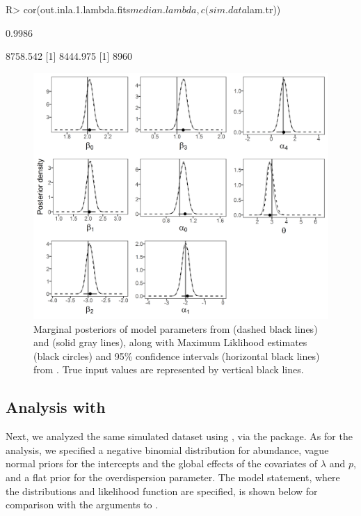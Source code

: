 \documentclass[codesnippet]{jss}
\begin{document}
\begin{CodeInput}
R> cor(out.inla.1.lambda.fits$median.lambda, c(sim.data$lam.tr))
\end{CodeInput}
\begin{CodeOutput}
[1] 0.9986
\end{CodeOutput}

\begin{CodeOutput}
[1] 8758.542
[1] 8444.975
[1] 8960
\end{CodeOutput}

\begin{figure}[p]
\includegraphics[width=\linewidth]{jss3107fig1.png}
\caption{Marginal posteriors of model parameters from  (dashed black lines) and  (solid gray lines), along with Maximum Liklihood estimates (black circles) and 95\% confidence intervals (horizontal black lines) from .  True input values are represented by vertical black lines.}
\label{fig:fig1}
\end{figure}

\subsection[Analysis with JAGS]{Analysis with }
Next, we analyzed the same simulated dataset using , via the  package. As for the  analysis, we specified a negative binomial distribution for abundance, vague normal priors for the intercepts and the global effects of the covariates of $\lambda$ and $p$, and a flat prior for the overdispersion parameter.  The  model statement, where the distributions and likelihood function are specified, is shown below for comparison with the arguments to .
\end{document}
